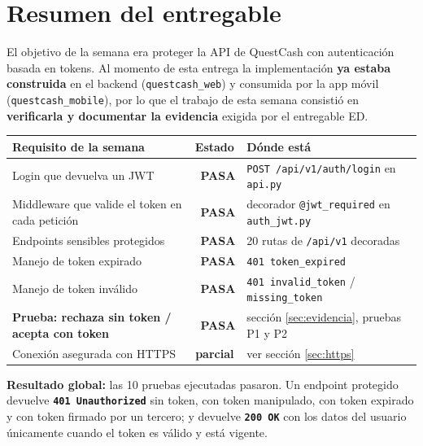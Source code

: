 \documentclass[11pt,letterpaper]{article}
\newcommand{\ok}{\textcolor{qcGreen}{\textbf{\checkmark\ PASA}}}
\newcommand{\http}[2]{\textcolor{#1}{\texttt{\textbf{#2}}}}
\begin{document}
\section{Resumen del entregable}

El objetivo de la semana era proteger la API de QuestCash con autenticación basada en
tokens. Al momento de esta entrega la implementación \textbf{ya estaba construida} en el
backend (\texttt{questcash\_web}) y consumida por la app móvil (\texttt{questcash\_mobile}),
por lo que el trabajo de esta semana consistió en \textbf{verificarla y documentar la
evidencia} exigida por el entregable ED.

\vspace{0.4em}
\begin{center}
\begin{tabular}{@{}p{7.2cm} c p{5.4cm}@{}}
\toprule
\textbf{Requisito de la semana} & \textbf{Estado} & \textbf{Dónde está} \\
\midrule
Login que devuelva un JWT & \ok & \texttt{POST /api/v1/auth/login} en \texttt{api.py} \\[2pt]
Middleware que valide el token en cada petición & \ok & decorador \texttt{@jwt\_required} en \texttt{auth\_jwt.py} \\[2pt]
Endpoints sensibles protegidos & \ok & 20 rutas de \texttt{/api/v1} decoradas \\[2pt]
Manejo de token expirado & \ok & \texttt{401 token\_expired} \\[2pt]
Manejo de token inválido & \ok & \texttt{401 invalid\_token} / \texttt{missing\_token} \\[2pt]
\textbf{Prueba: rechaza sin token / acepta con token} & \ok & sección \ref{sec:evidencia}, pruebas P1 y P2 \\[2pt]
Conexión asegurada con HTTPS & \textcolor{qcAmber}{\textbf{parcial}} & ver sección \ref{sec:https} \\
\bottomrule
\end{tabular}
\end{center}

\vspace{0.6em}
\begin{nota}
\textbf{Resultado global:} las 10 pruebas ejecutadas pasaron. Un endpoint protegido
devuelve \http{qcRed}{401 Unauthorized} sin token, con token manipulado, con token
expirado y con token firmado por un tercero; y devuelve \http{qcGreen}{200 OK} con los
datos del usuario únicamente cuando el token es válido y está vigente.
\end{nota}
\end{document}
